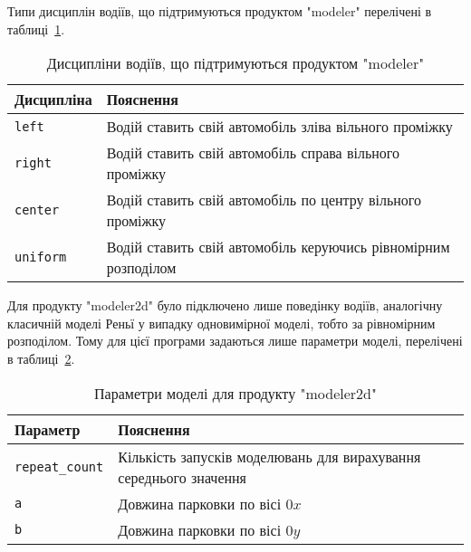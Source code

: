 Типи дисциплін водіїв, що підтримуються продуктом "modeler" перелічені в таблиці~\ref{tab:modeler_behaviours}.

\begin{table}[ht]
	\caption{Дисципліни водіїв, що підтримуються продуктом "modeler"}
	\centering
\begin{tabular}{|p{}|p{}|}
	\hline
	Дисципліна & Пояснення \\
	\hline
	\verb!left! & Водій ставить свій автомобіль зліва вільного проміжку \\
	\hline
	\verb!right! & Водій ставить свій автомобіль справа вільного проміжку \\
	\hline
	\verb!center! & Водій ставить свій автомобіль по центру вільного проміжку \\
	\hline
	\verb!uniform! & Водій ставить свій автомобіль керуючись рівномірним розподілом \\
	\hline
\end{tabular}	
	\label{tab:modeler_behaviours}
\end{table}

Для продукту "modeler2d" було підключено лише поведінку водіїв, аналогічну класичній моделі Реньї у випадку одновимірної моделі, тобто за рівномірним розподілом. Тому для цієї програми задаються лише параметри моделі, перелічені в таблиці~\ref{tab:modeler2d_model_params}.

\begin{table}[ht]
	\caption{Параметри моделі для продукту "modeler2d"}
	\centering
\begin{tabular}{|p{}|p{}|}
	\hline
	Параметр & Пояснення \\
	\hline
	\verb!repeat_count! & Кількість запусків моделювань для вирахування середнього значення \\
	\hline
	\verb!a! & Довжина парковки по вісі $0x$ \\
	\hline
	\verb!b! & Довжина парковки по вісі $0y$ \\
	\hline
\end{tabular}	
	\label{tab:modeler2d_model_params}
\end{table}



